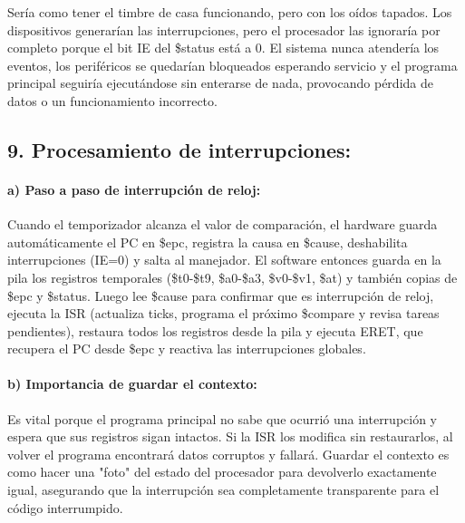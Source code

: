 \documentclass[12pt]{article}
\begin{document}
\vspace{0.2cm}

Sería como tener el timbre de casa funcionando, pero con los oídos tapados. Los dispositivos generarían las interrupciones, pero el procesador las ignoraría por completo porque el bit IE del \$status está a 0. El sistema nunca atendería los eventos, los periféricos se quedarían bloqueados esperando servicio y el programa principal seguiría ejecutándose sin enterarse de nada, provocando pérdida de datos o un funcionamiento incorrecto.

\begin{center}
\subsection*{9. Procesamiento de interrupciones:}
\end{center}

\paragraph*{a) Paso a paso de interrupción de reloj:}

\vspace{0.2cm}

Cuando el temporizador alcanza el valor de comparación, el hardware guarda automáticamente el PC en \$epc, registra la causa en \$cause, deshabilita interrupciones (IE=0) y salta al manejador. El software entonces guarda en la pila los registros temporales (\$t0-\$t9, \$a0-\$a3, \$v0-\$v1, \$at) y también copias de \$epc y \$status. Luego lee \$cause para confirmar que es interrupción de reloj, ejecuta la ISR (actualiza ticks, programa el próximo \$compare y revisa tareas pendientes), restaura todos los registros desde la pila y ejecuta ERET, que recupera el PC desde \$epc y reactiva las interrupciones globales.

\vspace{0.2cm}

\paragraph*{b) Importancia de guardar el contexto:}

\vspace{0.2cm}

Es vital porque el programa principal no sabe que ocurrió una interrupción y espera que sus registros sigan intactos. Si la ISR los modifica sin restaurarlos, al volver el programa encontrará datos corruptos y fallará. Guardar el contexto es como hacer una "foto" del estado del procesador para devolverlo exactamente igual, asegurando que la interrupción sea completamente transparente para el código interrumpido.
\end{document}
